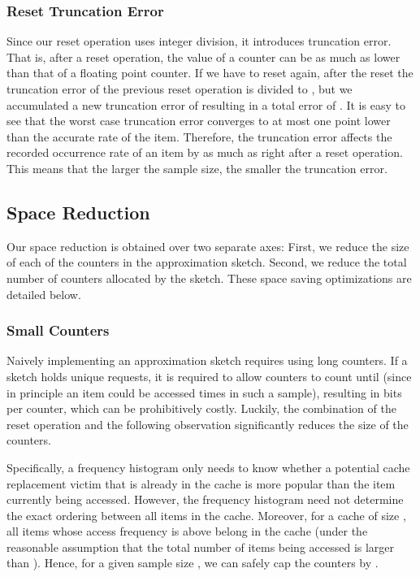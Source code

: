 \documentclass[10pt,a4paper]{article}
\begin{document}
\subsubsection{Reset Truncation Error}

Since our reset operation uses integer division, it introduces truncation error.
That is, after a reset operation, the value of a counter can be as much as  lower than that of a floating point counter.
If we have to reset again, after the reset the truncation error of the previous reset operation is divided to , but we accumulated a new truncation error of  resulting in a total error of .
It is easy to see that the worst case truncation error converges to at most one point lower than the accurate rate of the item.
Therefore, the truncation error affects the recorded occurrence rate of an item by as much as  right after a reset operation.
This means that the larger the sample size, the smaller the truncation error.

\subsection{Space Reduction}
Our space reduction is obtained over two separate axes: First, we reduce the size of each of the counters in the approximation sketch.
Second, we reduce the total number of counters allocated by the sketch. These space saving optimizations are detailed below.

\subsubsection{Small Counters}
Naively implementing an approximation sketch requires using long counters.
If a sketch holds  unique requests, it is required to allow counters to count until  (since in principle an item could
be accessed  times in such a sample), resulting in  bits per counter, which can be prohibitively costly.
Luckily, the combination of the reset operation and the following observation significantly reduces the size of the counters.

Specifically, a frequency histogram only needs to know whether a potential cache replacement victim that is already in the cache is more popular than the item currently being accessed. However, the frequency histogram need not determine the exact ordering
between all items in the cache.
Moreover, for a cache of size , all items whose access frequency is above  belong in the cache (under the reasonable assumption
that the total number of items being accessed is larger than ). Hence, for a given sample size , we can safely cap the counters by .
\end{document}
